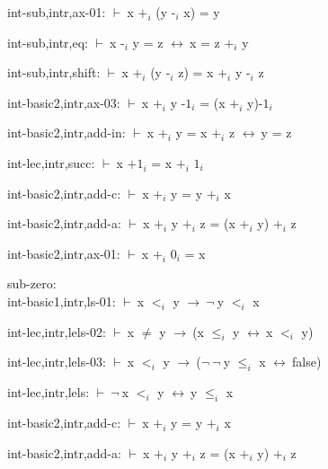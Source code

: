 \documentclass[a4paper]{article}
\newcommand{\Fol}{\mbox{$\vdash\ $}}
\newcommand{\Not}{\mbox{$\neg\ $}}
\newcommand{\Imp}{\mbox{$\rightarrow\ $}}
\newcommand{\Equiv}{\mbox{$\leftrightarrow\ $}}
\begin{document}
int-sub,intr,ax-01: 
 \Fol x $\mbox{+}_{i}$ (y $\mbox{-}_{i}$ x) = y



int-sub,intr,eq: 
 \Fol x $\mbox{-}_{i}$ y = z \Equiv x = z $\mbox{+}_{i}$ y



int-sub,intr,shift: 
 \Fol x $\mbox{+}_{i}$ (y $\mbox{-}_{i}$ z) = x $\mbox{+}_{i}$ y $\mbox{-}_{i}$ z



int-basic2,intr,ax-03: 
 \Fol x $\mbox{+}_{i}$ y $\mbox{-1}_{i}$ = (x $\mbox{+}_{i}$ y)$\mbox{-1}_{i}$



int-basic2,intr,add-in: 
 \Fol x $\mbox{+}_{i}$ y = x $\mbox{+}_{i}$ z \Equiv y = z



int-lec,intr,succ: 
 \Fol x $\mbox{+1}_{i}$ = x $\mbox{+}_{i}$ $\mbox{1}_{i}$



int-basic2,intr,add-c: 
 \Fol x $\mbox{+}_{i}$ y = y $\mbox{+}_{i}$ x



int-basic2,intr,add-a: 
 \Fol x $\mbox{+}_{i}$ y $\mbox{+}_{i}$ z = (x $\mbox{+}_{i}$ y) $\mbox{+}_{i}$ z



int-basic2,intr,ax-01: 
 \Fol x $\mbox{+}_{i}$ $\mbox{0}_{i}$ = x



\bigskip

sub-zero:\\ int-basic1,intr,ls-01: 
 \Fol x $\mbox{$<$}_{i}$ y \Imp \Not y $\mbox{$<$}_{i}$ x



int-lec,intr,lels-02: 
 \Fol x $\neq$ y \Imp (x $\mbox{$\le$}_{i}$ y \Equiv x $\mbox{$<$}_{i}$ y)



int-lec,intr,lels-03: 
 \Fol x $\mbox{$<$}_{i}$ y \Imp (\Not \Not y $\mbox{$\le$}_{i}$ x \Equiv false)



int-lec,intr,lels: 
 \Fol \Not x $\mbox{$<$}_{i}$ y \Equiv y $\mbox{$\le$}_{i}$ x



int-basic2,intr,add-c: 
 \Fol x $\mbox{+}_{i}$ y = y $\mbox{+}_{i}$ x



int-basic2,intr,add-a: 
 \Fol x $\mbox{+}_{i}$ y $\mbox{+}_{i}$ z = (x $\mbox{+}_{i}$ y) $\mbox{+}_{i}$ z
\end{document}
